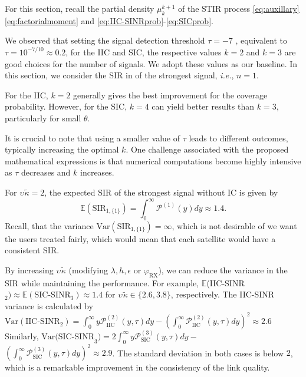 \documentclass[lettersize,journal]{IEEEtran}
\begin{document}
For this section, recall the partial density $\mu_k^{k+1}$ of the STIR process \eqref{eq:auxillary} \eqref{eq:factorialmoment} and \eqref{eq:IIC-SINRprob}-\eqref{eq:SICprob}.

We observed that setting the signal detection threshold $\tau = -7$ , equivalent to $\tau = 10^{-7/10} \approx 0.2$, for the IIC and SIC, the respective values $k = 2$ and $k=3$ are good choices for the number of signals. We adopt these values as our baseline. In this section, we consider the SIR in of the strongest signal, \textit{i.e.}, $n=1$.

For the IIC, $k = 2$ generally gives the best improvement for the coverage probability. However, for the SIC, $k = 4$ can yield better results than $k = 3$, particularly for small $\theta$.  

It is crucial to note that using a smaller value of $\tau$ leads to different outcomes, typically increasing the optimal $k$. One challenge associated with the proposed mathematical expressions is that numerical computations become highly intensive as $\tau$ decreases and $k$ increases.


For $\upsilon_{} \tilde{\kappa}=2$, the expected SIR of the strongest signal without IC is given by
\begin{equation}
  \mathbb{E}(\text{SIR}_{1,\{1\}})= \int_{0}^{\infty}\mathcal{P}^{(1)}(y)dy \approx 1.4.
\end{equation}
 Recall, that the variance $\text{Var}(\text{SIR}_{1,\{1\}})=\infty$, which is not desirable of we want the users treated fairly, which would mean that each satellite would have a consistent SIR.

  By increasing $\upsilon_{} \tilde{\kappa}$ (modifying $\lambda,h,\epsilon$ or $\varphi_{\text{RX}}$), we can reduce the variance in the SIR while maintaining the performance. For example, $ \mathbb{E}$(IIC-SINR$_{2}) \approx \mathbb{E}(\text{SIC-SINR}_{3}) \approx 1.4$ for $\upsilon_{} \tilde{\kappa}\in \{2.6,3.8\}$, respectively. The IIC-SINR variance is calculated by
  $\text{Var}(\text{IIC-SINR}_{2})=\int_{0}^{\infty}y\mathcal{P}_{\text{IIC}}^{(2)}(y,\tau)dy -\left(\int_{0}^{\infty}\mathcal{P}_{\text{IIC}}^{(2)}(y,\tau)dy\right)^2  \approx 2.6$ Similarly, $\text{Var(SIC-SINR}_{3}) = 2\int_{0}^{\infty}y\mathcal{P}_{\text{SIC}}^{(3)}(y,\tau)dy-$ $\left(\int_{0}^{\infty}\mathcal{P}_{\text{SIC}}^{(3)}(y,\tau)dy\right)^2 \approx 2.9$. The standard deviation in both cases is below $2$, which is a remarkable improvement in the consistency of the link quality.
\end{document}
